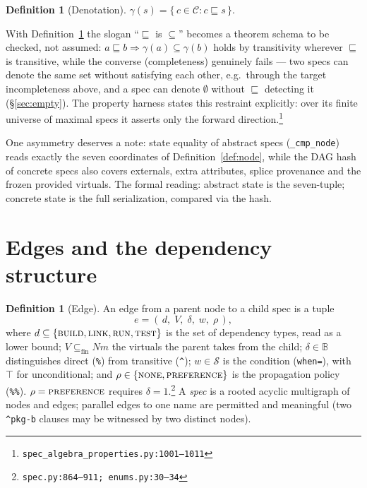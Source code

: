 \documentclass[11pt]{article}
\theoremstyle{definition}
\newtheorem{definition}[theorem]{Definition}
\theoremstyle{remark}
\newcommand{\sat}{\sqsubseteq}
\newcommand{\den}[1]{\gamma(#1)}
\newcommand{\Spec}{\mathcal{S}}
\newcommand{\Conc}{\mathcal{C}}
\newcommand{\Names}{\mathit{Nm}}
\newcommand{\code}[1]{\texttt{#1}}
\newcommand{\src}[1]{\footnote{\code{#1}}}
\newcommand{\Bool}{\mathbb{B}}
\begin{document}
\begin{definition}[Denotation]\label{def:denotation}
$\den{s} = \{\, c \in \Conc : c \sat s \,\}$.
\end{definition}

With Definition~\ref{def:denotation} the slogan ``$\sat$ is $\subseteq$''
becomes a theorem schema to be checked, not assumed: $a \sat b \Rightarrow
\den{a} \subseteq \den{b}$ holds by transitivity wherever $\sat$ is
transitive, while the converse (completeness) genuinely fails --- two specs
can denote the same set without satisfying each other, e.g.\ through the
target incompleteness above, and a spec can denote $\emptyset$ without $\sat$
detecting it (\S\ref{sec:empty}).  The property harness states this
restraint explicitly: over its finite universe of maximal specs it asserts
only the forward direction.\src{spec\_algebra\_properties.py:1001--1011}

One asymmetry deserves a note: state equality of abstract specs
(\code{\_cmp\_node}) reads exactly the seven coordinates of
Definition~\ref{def:node}, while the DAG hash of concrete specs also covers
externals, extra attributes, splice provenance and the frozen provided
virtuals.  The formal reading: abstract state is the seven-tuple; concrete
state is the full serialization, compared via the hash.

\section{Edges and the dependency structure}\label{sec:edges}

\begin{definition}[Edge]\label{def:edge}
An edge from a parent node to a child spec is a tuple
\[
  e = (\,d,\; V,\; \delta,\; w,\; \rho\,),
\]
where $d \subseteq \{\textsc{build}, \textsc{link}, \textsc{run},
\textsc{test}\}$ is the set of dependency types, read as a lower bound;
$V \subseteq_{\mathrm{fin}} \Names$ the virtuals the parent takes from the
child; $\delta \in \Bool$ distinguishes direct (\code{\%}) from transitive
(\code{\^{}}); $w \in \Spec$ is the condition (\code{when=}), with $\top$ for
unconditional; and $\rho \in \{\textsc{none}, \textsc{preference}\}$ is the
propagation policy (\code{\%\%}).
$\rho = \textsc{preference}$ requires $\delta = 1$.\src{spec.py:864--911;
enums.py:30--34}  A \emph{spec} is a rooted acyclic multigraph of nodes and
edges; parallel edges to one name are permitted and meaningful (two
\code{\^{}pkg-b} clauses may be witnessed by two distinct nodes).
\end{definition}
\end{document}
